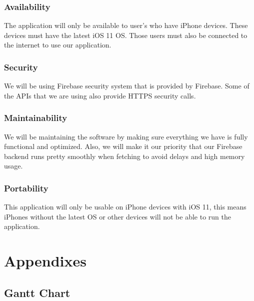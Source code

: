\documentclass[onecolumn, draftclsnofoot,10pt, compsoc]{IEEEtran}
\begin{document}
\subsubsection{Availability}
The application will only be available to user's who have iPhone devices. These devices must have the latest iOS 11 OS. Those users must also be connected to the internet to use our application.

\subsubsection{Security}
We will be using Firebase security system that is provided by Firebase. Some of the APIs that we are using also provide HTTPS security calls.

\subsubsection{Maintainability}
We will be maintaining the software by making sure everything we have is fully functional and optimized. Also, we will make it our priority that our Firebase backend runs pretty smoothly when fetching to avoid delays and high memory usage.

\subsubsection{Portability}
This application will only be usable on iPhone devices with iOS 11, this means iPhones without the latest OS or other devices will not be able to run the application.

\section{Appendixes}
\subsection{Gantt Chart}
\begin{ganttchart}{1}{30}
     \\
	 \\
	 \\
	 \\
     \\
     \\
     \\
     \\
     \\
     \\
    
    
\end{ganttchart}
\end{document}
